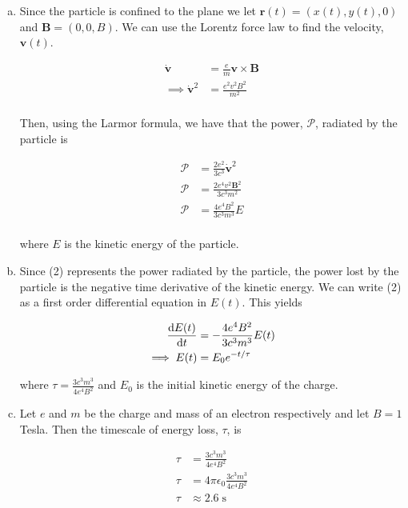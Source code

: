 \documentclass[]{article}
\begin{document}
\begin{enumerate}[a)]


\item Since the particle is confined to the plane we let $\bm{r}(t) = (x(t), y(t), 0)$ and $\bm{B} = (0,0,B)$. We can use the Lorentz force law to find the velocity, $\bm{v}(t)$. 

\begin{equation}
\begin{split}
\dot{\bm{v}} & = \frac{e}{m} \bm{v} \times \bm{B} \\
\implies \dot{\bm{v}}^2 & = \frac{e^2 v^2 B^2}{m^2}  \\
\end{split}
\end{equation}

Then, using the Larmor formula, we have that the power, $\mathscr{P}$, radiated by the particle is

\begin{equation}
\begin{split}
\mathscr{P} & = \frac{2e^2}{3c^3}  \dot{\bm{v}}^2 \\
\mathscr{P} & = \frac{2 e^4 v^2\bm{B}^2}{3 c^3m^2}  \\
\mathscr{P} & = \frac{4 e^4 B^2}{3 c^3m^3} E \\
\end{split}
\end{equation}

where $E$ is the kinetic energy of the particle. \\

\item Since (2) represents the power radiated by the particle, the power lost by the particle is the negative time derivative of the kinetic energy. We can write (2) as a first order differential equation in $E(t)$. This yields

\begin{equation}
\begin{split}
\dv{E(t)}{t} & =  -   \frac{4 e^4 B^2}{3 c^3m^3} E(t) \\
\implies E(t) & =  E_0 e^{ -  t/\tau}
\end{split}
\end{equation}

where $\tau = \frac{3 c^3m^3}{4 e^4 B^2}$ and $E_0$ is the initial kinetic energy of the charge. \\

\item Let $e$ and $m$ be the charge and mass of an electron respectively and let $B = 1$ Tesla. Then the timescale of energy loss, $\tau$, is

\begin{equation}
\begin{split}
\tau & = \frac{3 c^3m^3}{4 e^4 B^2} \\
\tau & =  4\pi\epsilon_0 \frac{3 c^3m^3}{4 e^4 B^2} \\
\tau & \approx 2.6 \; \text{s} \\ 
\end{split}
\end{equation}

\end{enumerate}
\end{document}
